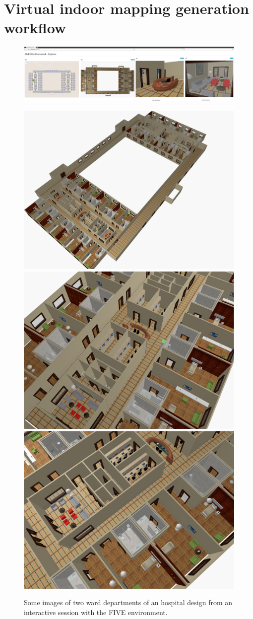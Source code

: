 \section{Virtual indoor mapping generation workflow}\label{workflow}


\begin{figure}[ptb] %
   \centering
   \includegraphics[width=\linewidth]{images/ward/ward} 
   
   \includegraphics[width=0.327\linewidth]{images/ward/ward1} 
   \includegraphics[width=0.327\linewidth]{images/ward/ward4} 
   \includegraphics[width=0.327\linewidth]{images/ward/ward5} 
   \caption{Some images of two ward departments of an hospital design from an interactive session with the FIVE environment.}
   \label{fig:example}
\end{figure}



